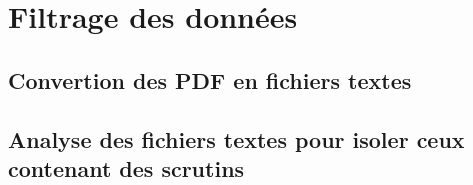 \section{Filtrage des données}

\subsection{Convertion des PDF en fichiers textes}

\subsection[Analyse des fichiers textes pour isoler les scrutins]{Analyse des fichiers textes pour isoler ceux contenant des scrutins}
